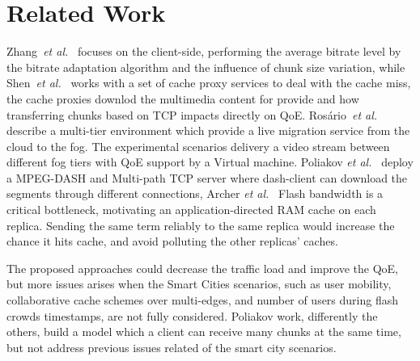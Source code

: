 \section*{Related Work}
\label{sec:releated-work}

Zhang~\textit{et al.}~\cite{zhangINFOCOM17} focuses on the client-side, performing the average bitrate level by the bitrate adaptation algorithm and the influence of chunk size variation, while Shen~\textit{et al.}~\cite{shenIWQoS19} works with a set of cache proxy services to deal with the cache miss, the cache proxies downlod the multimedia content for provide and how transferring chunks based on TCP impacts directly on QoE. Rosário~\textit{et al.}~\cite{rosarioSENSORS2018} describe a multi-tier environment which provide a live migration service from the cloud to the fog. The experimental scenarios delivery a video stream between different fog tiers with QoE support by a Virtual machine.
Poliakov \textit{et al.}~\cite{poliakovPHD2018} deploy a MPEG-DASH and Multi-path TCP server where dash-client can download the segments through different connections, 
Archer \textit{et al.}~\cite{archerGoogleJournal2019} Flash bandwidth is a critical bottleneck, motivating an application-directed RAM cache on each replica. Sending the same term reliably to the same replica would increase the chance it hits cache, and avoid polluting the other replicas’ caches.

The proposed approaches could decrease the traffic load and improve the QoE, but more issues arises when the Smart Cities scenarios, such as user mobility, collaborative cache schemes over multi-edges, and number of users during flash crowds timestamps, are not fully considered. Poliakov work, differently the others, build a model which a client can receive many chunks at the same time, but not address previous issues related of the smart city scenarios.




